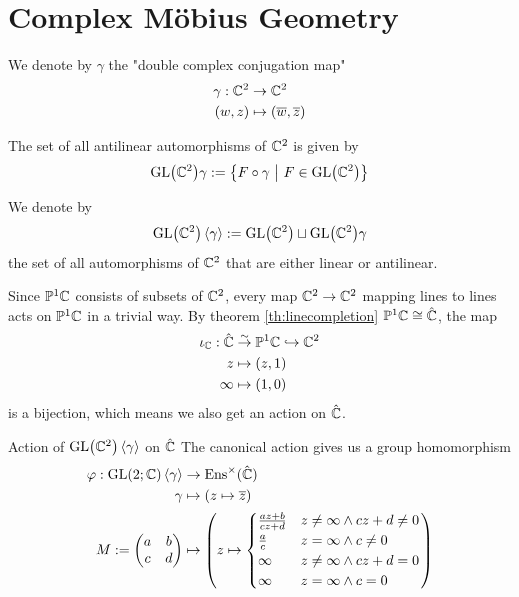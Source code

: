 \section{Complex Möbius Geometry}
\begin{definition}
	We denote by $\gamma$ the "double complex conjugation map"
	\begin{align*}
		\gamma : \mathbb{C}^2 &\to \mathbb{C}^2\\
		(w,z) &\mapsto (\overline{{w}}, \overline{{z}})
	\end{align*}
\end{definition}
\begin{theorem}
	The set of all antilinear automorphisms of $\mathbb{C}^2$ is given by
	\begin{align*}
		\textnormal{GL}\qty(\mathbb{C}^2)\gamma := \qty{F \circ \gamma ~\middle|~F \in \textnormal{GL}\qty(\mathbb{C}^2)}
	\end{align*}
\end{theorem}
\begin{definition}
	We denote by $$\textnormal{GL}\qty(\mathbb{C}^2)\left\langle \gamma \right\rangle := \textnormal{GL}\qty(\mathbb{C}^2) \sqcup \textnormal{GL}\qty(\mathbb{C}^2)\gamma$$
	the set of all automorphisms of $\mathbb{C}^2$ that are either linear or antilinear.
\end{definition}
Since $\mathbb{P}^1 \mathbb{C}$ consists of subsets of $\mathbb{C}^2$, every map $\mathbb{C}^2 \to \mathbb{C}^2$ mapping lines to lines acts on $\mathbb{P}^1 \mathbb{C}$ in a trivial way. By theorem \ref{th:linecompletion} $\mathbb{P}^1 \mathbb{C} \cong \hat {\mathbb{C}}$, the map 
\begin{align*}
	\iota_{\mathbb{C}} : 
	\hat {\mathbb{C}} &\overset{\sim}{\rightarrow} \mathbb{P}^1 \mathbb{C} \hookrightarrow \mathbb{C}^2\\
	z &\mapsto (z,1)\\
	\infty &\mapsto (1,0)
\end{align*}
is a bijection, which means we also get an action on $\hat {\mathbb{C}}$.
\begin{importanttheorem}{Action of $\textnormal{GL}\qty(\mathbb{C}^2)\left\langle \gamma \right\rangle$ on $\hat {\mathbb{C}}$}{}
	The canonical action gives us a group homomorphism
	\begin{align*}
		\varphi : \textnormal{GL}(2; \mathbb{C})\left\langle \gamma \right\rangle&\to \textnormal{Ens}^\times(\hat {\mathbb{C}})\\
		\gamma &\mapsto \qty(z \mapsto \overline{{z}})\\
		M :=
		\begin{pmatrix}
			a & b\\
			c & d
		\end{pmatrix}
		&\mapsto
		\qty(
		z \mapsto 
		\begin{cases}
			\frac{az + b}{cz + d}
			&
			z \neq \infty \wedge cz + d \neq 0\\
			\frac{a}{c}
			&
			z = \infty \wedge c \neq 0\\
			\infty
			&
			z \neq \infty \wedge cz + d = 0\\
			\infty
			&
			z = \infty \wedge c = 0
		\end{cases}
		)
	\end{align*}
\end{importanttheorem}
